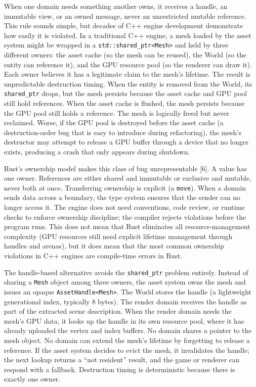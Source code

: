 \documentclass[
  11pt,
  letterpaper,
  DIV=11,
  numbers=noendperiod,
  twoside,
  open=right]{scrreprt}
\begin{document}
When one domain needs something another owns, it receives a handle, an
immutable view, or an owned message, never an unrestricted mutable
reference. This rule sounds simple, but decades of C++ engine
development demonstrate how easily it is violated. In a traditional C++
engine, a mesh loaded by the asset system might be wrapped in a
\texttt{std::shared\_ptr\textless{}Mesh\textgreater{}} and held by three
different owners: the asset cache (so the mesh can be reused), the World
(so the entity can reference it), and the GPU resource pool (so the
renderer can draw it). Each owner believes it has a legitimate claim to
the mesh's lifetime. The result is unpredictable destruction timing.
When the entity is removed from the World, its \texttt{shared\_ptr}
drops, but the mesh persists because the asset cache and GPU pool still
hold references. When the asset cache is flushed, the mesh persists
because the GPU pool still holds a reference. The mesh is logically
freed but never reclaimed. Worse, if the GPU pool is destroyed before
the asset cache (a destruction-order bug that is easy to introduce
during refactoring), the mesh's destructor may attempt to release a GPU
buffer through a device that no longer exists, producing a crash that
only appears during shutdown.

Rust's ownership model makes this class of bug unrepresentable {[}6{]}.
A value has one owner. References are either shared and immutable or
exclusive and mutable, never both at once. Transferring ownership is
explicit (a \texttt{move}). When a domain sends data across a boundary,
the type system ensures that the sender can no longer access it. The
engine does not need conventions, code review, or runtime checks to
enforce ownership discipline; the compiler rejects violations before the
program runs. This does not mean that Rust eliminates all
resource-management complexity (GPU resources still need explicit
lifetime management through handles and arenas), but it does mean that
the most common ownership violations in C++ engines are compile-time
errors in Rust.

The handle-based alternative avoids the \texttt{shared\_ptr} problem
entirely. Instead of sharing a \texttt{Mesh} object among three owners,
the asset system owns the mesh and issues an opaque
\texttt{AssetHandle\textless{}Mesh\textgreater{}}. The World stores the
handle (a lightweight generational index, typically 8 bytes). The render
domain receives the handle as part of the extracted scene description.
When the render domain needs the mesh's GPU data, it looks up the handle
in its own resource pool, where it has already uploaded the vertex and
index buffers. No domain shares a pointer to the mesh object. No domain
can extend the mesh's lifetime by forgetting to release a reference. If
the asset system decides to evict the mesh, it invalidates the handle;
the next lookup returns a ``not resident'' result, and the game or
renderer can respond with a fallback. Destruction timing is
deterministic because there is exactly one owner.
\end{document}
